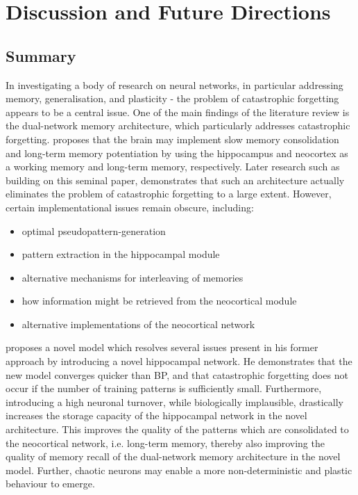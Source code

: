 
\chapter{Discussion and Future Directions}\label{chpt:discussion_future_work}
\section{Summary}


In investigating a body of research on neural networks, in particular addressing memory, generalisation, and plasticity - the problem of catastrophic forgetting appears to be a central issue. One of the main findings of the literature review is the dual-network memory architecture, which particularly addresses catastrophic forgetting. \cite{McClelland1995} proposes that the brain may implement slow memory consolidation and long-term memory potentiation by using the hippocampus and neocortex as a working memory and long-term memory, respectively. Later research such as \citep{French1997, Ans1997, Ans2000, French2001, Hattori2010, Hattori2014} building on this seminal paper, demonstrates that such an architecture actually eliminates the problem of catastrophic forgetting to a large extent. However, certain implementational issues remain obscure, including:
\begin{itemize}
\item optimal pseudopattern-generation
\item pattern extraction in the hippocampal module
\item alternative mechanisms for interleaving of memories
\item how information might be retrieved from the neocortical module
\item alternative implementations of the neocortical network
\end{itemize}

\cite{Hattori2014} proposes a novel model which resolves several issues present in his former approach by introducing a novel hippocampal network. He demonstrates that the new model converges quicker than BP, and that catastrophic forgetting does not occur if the number of training patterns is sufficiently small. Furthermore, introducing a high neuronal turnover, while biologically implausible, drastically increases the storage capacity of the hippocampal network in the novel architecture. This improves the quality of the patterns which are consolidated to the neocortical network, i.e. long-term memory, thereby also improving the quality of memory recall of the dual-network memory architecture in the novel model. Further, chaotic neurons may enable a more non-deterministic and plastic behaviour to emerge.

